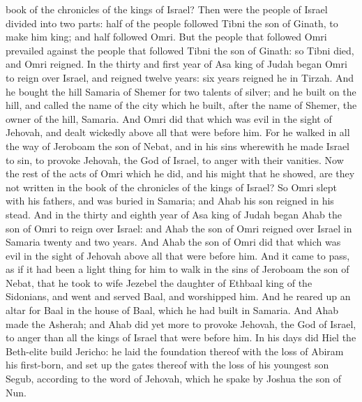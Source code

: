 book of the chronicles of the kings of Israel?  Then were the people of Israel divided into two parts: half of the people followed Tibni the son of Ginath, to make him king; and half followed Omri. But the people that followed Omri prevailed against the people that followed Tibni the son of Ginath: so Tibni died, and Omri reigned. In the thirty and first year of Asa king of Judah began Omri to reign over Israel, and reigned twelve years: six years reigned he in Tirzah. And he bought the hill Samaria of Shemer for two talents of silver; and he built on the hill, and called the name of the city which he built, after the name of Shemer, the owner of the hill, Samaria. And Omri did that which was evil in the sight of Jehovah, and dealt wickedly above all that were before him. For he walked in all the way of Jeroboam the son of Nebat, and in his sins wherewith he made Israel to sin, to provoke Jehovah, the God of Israel, to anger with their vanities. Now the rest of the acts of Omri which he did, and his might that he showed, are they not written in the book of the chronicles of the kings of Israel? So Omri slept with his fathers, and was buried in Samaria; and Ahab his son reigned in his stead.  And in the thirty and eighth year of Asa king of Judah began Ahab the son of Omri to reign over Israel: and Ahab the son of Omri reigned over Israel in Samaria twenty and two years. And Ahab the son of Omri did that which was evil in the sight of Jehovah above all that were before him. And it came to pass, as if it had been a light thing for him to walk in the sins of Jeroboam the son of Nebat, that he took to wife Jezebel the daughter of Ethbaal king of the Sidonians, and went and served Baal, and worshipped him. And he reared up an altar for Baal in the house of Baal, which he had built in Samaria. And Ahab made the Asherah; and Ahab did yet more to provoke Jehovah, the God of Israel, to anger than all the kings of Israel that were before him. In his days did Hiel the Beth-elite build Jericho: he laid the foundation thereof with the loss of Abiram his first-born, and set up the gates thereof with the loss of his youngest son Segub, according to the word of Jehovah, which he spake by Joshua the son of Nun. 

